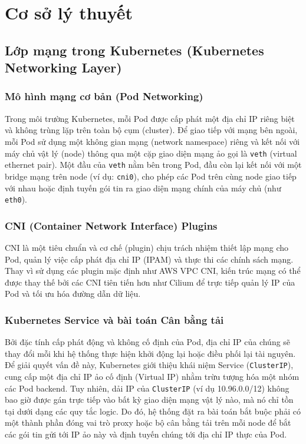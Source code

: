 
\chapter{Cơ sở lý thuyết}


\section{Lớp mạng trong Kubernetes (Kubernetes Networking Layer)}

\subsection{Mô hình mạng cơ bản (Pod Networking)}
Trong môi trường Kubernetes, mỗi Pod được cấp phát một địa chỉ IP riêng biệt và không trùng lặp trên toàn bộ cụm (cluster). Để giao tiếp với mạng bên ngoài, mỗi Pod sử dụng một không gian mạng (network namespace) riêng và kết nối với máy chủ vật lý (node) thông qua một cặp giao diện mạng ảo gọi là \texttt{veth} (virtual ethernet pair). Một đầu của \texttt{veth} nằm bên trong Pod, đầu còn lại kết nối với một bridge mạng trên node (ví dụ: \texttt{cni0}), cho phép các Pod trên cùng node giao tiếp với nhau hoặc định tuyến gói tin ra giao diện mạng chính của máy chủ (như \texttt{eth0}).

\subsection{CNI (Container Network Interface) Plugins}
CNI là một tiêu chuẩn và cơ chế (plugin) chịu trách nhiệm thiết lập mạng cho Pod, quản lý việc cấp phát địa chỉ IP (IPAM) và thực thi các chính sách mạng. Thay vì sử dụng các plugin mặc định như AWS VPC CNI, kiến trúc mạng có thể được thay thế bởi các CNI tiên tiến hơn như Cilium để trực tiếp quản lý IP của Pod và tối ưu hóa đường dẫn dữ liệu.

\subsection{Kubernetes Service và bài toán Cân bằng tải}
Bởi đặc tính cấp phát động và không cố định của Pod, địa chỉ IP của chúng sẽ thay đổi mỗi khi hệ thống
 thực hiện khởi động lại hoặc điều phối lại tài nguyên. Để giải quyết vấn đề này, Kubernetes giới thiệu khái niệm
  Service (\texttt{ClusterIP}), cung cấp một địa chỉ IP ảo cố định (Virtual IP) nhằm trừu tượng hóa một nhóm các Pod backend. Tuy nhiên, dải IP của 
\texttt{ClusterIP} (ví dụ 10.96.0.0/12) không bao giờ được gán trực tiếp vào bất kỳ giao diện mạng vật lý nào, mà nó 
chỉ tồn tại dưới dạng các quy tắc logic. Do đó, hệ thống đặt ra bài toán bắt buộc phải có một thành phần đóng vai 
trò proxy hoặc bộ cân bằng tải trên mỗi node để bắt các gói tin gửi tới IP ảo này và định tuyến chúng tới địa chỉ 
IP thực của Pod.

